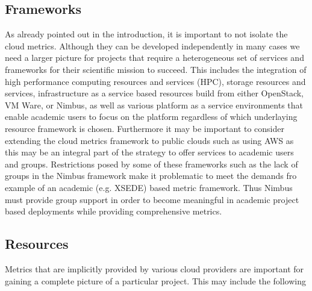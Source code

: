\documentclass{sig-alternate-05-2015}
\begin{document}
\subsection{Frameworks}

As already pointed out in the introduction, it is important to not
isolate the cloud metrics. Although they can be developed
independently in many cases we need a larger picture for projects that
require a heterogeneous set of services and frameworks for their
scientific mission to succeed.  This includes the integration of high
performance computing resources and services (HPC), storage resources
and services, infrastructure as a service based resources build from
either OpenStack, VM Ware, or Nimbus, as well as various platform as a
service environments that enable academic users to focus on the
platform regardless of which underlaying resource framework is chosen.
Furthermore it may be important to consider extending the cloud
metrics framework to public clouds such as using AWS as this may be an
integral part of the strategy to offer services to academic users and
groups. Restrictions posed by some of these frameworks such as the
lack of groups in the Nimbus framework make it problematic to meet the
demands fro example of an academic (e.g. XSEDE) based metric
framework. Thus Nimbus must provide group support in order to become
meaningful in academic project based deployments while providing
comprehensive metrics.

\subsection{Resources}\label {S:resources}

Metrics that are implicitly provided by various cloud providers are
important for gaining a complete picture of a particular project. This
may include the following
\end{document}
